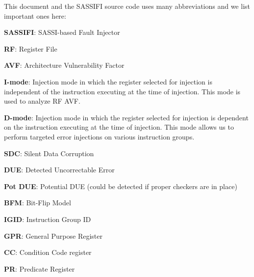 This document and the SASSIFI source code uses many abbreviations and we list important ones here:

{\bf SASSIFI}: SASSI-based Fault Injector 

{\bf RF}: Register File

{\bf AVF}: Architecture Vulnerability Factor 

{\bf I-mode}: Injection mode in which the register selected for injection is
independent of the instruction executing at the time of injection. This mode is
used to analyze RF AVF. 

{\bf D-mode}: Injection mode in which the register selected for injection is
dependent on the instruction executing at the time of injection. This mode
allows us to perform targeted error injections on various instruction groups.

{\bf SDC}: Silent Data Corruption 

{\bf DUE}: Detected Uncorrectable Error 

{\bf Pot DUE}: Potential DUE (could be detected if proper checkers are in place) 

{\bf BFM}: Bit-Flip Model 

{\bf IGID}: Instruction Group ID 

{\bf GPR}: General Purpose Register

{\bf CC}: Condition Code register

{\bf PR}: Predicate Register 

